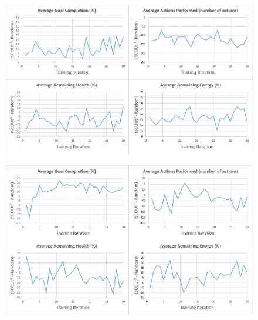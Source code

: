 \begin{appxfig}[H]
\begin{figure}[H]
  \includegraphics[width=0.9\columnwidth]{Figures/Results/TrainingVariation1/FindHuman.JPG}
\end{figure}
\caption{Iteration testing performance results for $SCOUt_{FH}$ attempting \textit{Find Human} using setup variation 1 (see subsection~\ref{subsec:training_variations}). All graphs show the controller's average difference in performance compared to $Random$ ($SCOUt_{FH}$ average - $Random$ average) VS the number of training iterations completed.}
\label{appendix:findhuman_training_variation1}
\end{appxfig}


\begin{appxfig}[H]
\begin{figure}[H]
  \includegraphics[width=0.9\columnwidth]{Figures/Results/TrainingVariation1/MapWater.JPG}
\end{figure}
\caption{Iteration testing performance results for $SCOUt_{MW}$ attempting \textit{Map Water} using setup variation 1 (see subsection~\ref{subsec:training_variations}). All graphs show the controller's average difference in performance compared to $Random$ ($SCOUt_{MW}$ average - $Random$ average) VS the number of training iterations completed.}
\label{appendix:mapwater_training_variation1}
\end{appxfig}


